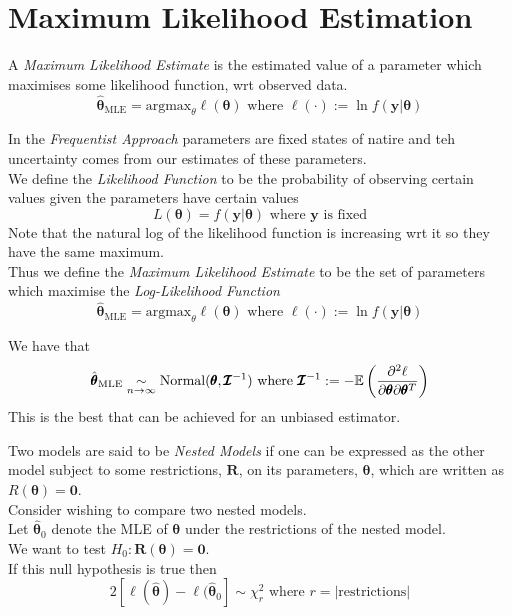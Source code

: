 \documentclass[11pt,a4paper]{article}
\begin{document}
\section{Maximum Likelihood Estimation}

A \textit{Maximum Likelihood Estimate} is the estimated value of a parameter which maximises some likelihood function, wrt observed data.
$$\hat{\pmb\theta}_\text{MLE}=\text{argmax}_\theta\ell(\pmb\theta)\text{ where }\ell(\cdot):=\ln f(\textbf{y}|\pmb\theta)$$


In the \textit{Frequentist Approach} parameters are fixed states of natire and teh uncertainty comes from our estimates of these parameters.\\
We define the \textit{Likelihood Function} to be the probability of observing certain values given the parameters have certain values
$$L(\pmb\theta)=f(\textbf{y}|\pmb\theta)\text{ where }\textbf{y}\text{ is fixed}$$
Note that the natural log of the likelihood function is increasing wrt it so they have the same maximum.\\
Thus we define the \textit{Maximum Likelihood Estimate} to be the set of parameters which maximise the \textit{Log-Likelihood Function}
$$\hat{\pmb\theta}_\text{MLE}=\text{argmax}_\theta\ell(\pmb\theta)\text{ where }\ell(\cdot):=\ln f(\textbf{y}|\pmb\theta)$$

We have that
$$\hat{\pmb\theta}_\text{MLE}\underset{n\to\infty}{\sim}\text{Normal}(\pmb\theta,\pmb{\mathcal{I}}^{-1})\text{ where }\pmb{\mathcal{I}}^{-1}:=-\mathbb{E}\left(\frac{\partial^2\ell}{\partial\pmb\theta\partial\pmb\theta^T}\right)$$
This is the best that can be achieved for an unbiased estimator.

Two models are said to be \textit{Nested Models} if one can be expressed as the other model subject to some restrictions, $\textbf{R}$, on its parameters, $\pmb\theta$, which are written as $R(\pmb\theta)=\pmb0$.\\

\proposition{}
Consider wishing to compare two nested models.\\
Let $\hat{\pmb\theta}_0$ denote the MLE of $\pmb\theta$ under the restrictions of the nested model.\\
We want to test $H_0:\textbf{R}(\pmb\theta)=\textbf{0}$.\\
If this null hypothesis is true then
$$2[\ell(\hat{\pmb\theta})-\ell(\hat{\pmb\theta}_0]\sim\chi^2_r\text{ where }r=|\text{restrictions}|$$
\end{document}
